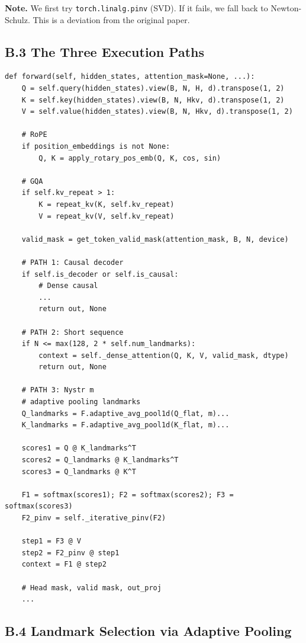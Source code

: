 \textbf{Note.} We first try \texttt{torch.linalg.pinv} (SVD). If it fails, we fall back 
to Newton-Schulz. This is a deviation from the original paper.

\subsection{B.3 The Three Execution Paths}

\begin{lstlisting}
def forward(self, hidden_states, attention_mask=None, ...):
    Q = self.query(hidden_states).view(B, N, H, d).transpose(1, 2)
    K = self.key(hidden_states).view(B, N, Hkv, d).transpose(1, 2)
    V = self.value(hidden_states).view(B, N, Hkv, d).transpose(1, 2)
    
    # RoPE
    if position_embeddings is not None:
        Q, K = apply_rotary_pos_emb(Q, K, cos, sin)
    
    # GQA
    if self.kv_repeat > 1:
        K = repeat_kv(K, self.kv_repeat)
        V = repeat_kv(V, self.kv_repeat)
    
    valid_mask = get_token_valid_mask(attention_mask, B, N, device)
    
    # PATH 1: Causal decoder
    if self.is_decoder or self.is_causal:
        # Dense causal
        ...
        return out, None
    
    # PATH 2: Short sequence
    if N <= max(128, 2 * self.num_landmarks):
        context = self._dense_attention(Q, K, V, valid_mask, dtype)
        return out, None
    
    # PATH 3: Nystr m
    # adaptive pooling landmarks
    Q_landmarks = F.adaptive_avg_pool1d(Q_flat, m)...
    K_landmarks = F.adaptive_avg_pool1d(K_flat, m)...
    
    scores1 = Q @ K_landmarks^T
    scores2 = Q_landmarks @ K_landmarks^T
    scores3 = Q_landmarks @ K^T
    
    F1 = softmax(scores1); F2 = softmax(scores2); F3 = softmax(scores3)
    F2_pinv = self._iterative_pinv(F2)
    
    step1 = F3 @ V
    step2 = F2_pinv @ step1
    context = F1 @ step2
    
    # Head mask, valid mask, out_proj
    ...
\end{lstlisting}

\subsection{B.4 Landmark Selection via Adaptive Pooling}

